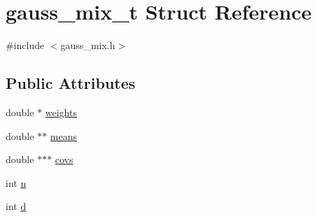 \hypertarget{structgauss__mix__t}{
\section{gauss\_\-mix\_\-t Struct Reference}
\label{structgauss__mix__t}
}


{\ttfamily \#include $<$gauss\_\-mix.h$>$}

\subsection*{Public Attributes}
\begin{DoxyCompactItemize}
\item 
double $\ast$ \hyperlink{structgauss__mix__t_a6893efd45b8fc3c2429edb0ed86b4976}{weights}
\item 
double $\ast$$\ast$ \hyperlink{structgauss__mix__t_abb85693a2d775f6ba34d1100b477c0fb}{means}
\item 
double $\ast$$\ast$$\ast$ \hyperlink{structgauss__mix__t_acc4f1f686c1d0a9c61c7879fa7cfe7d5}{covs}
\item 
int \hyperlink{structgauss__mix__t_a9d5ac0b73ca6f79f565336d55bf5b542}{n}
\item 
int \hyperlink{structgauss__mix__t_a881d5ed8cdff3267b86104fc0fa59d23}{d}
\end{DoxyCompactItemize}


